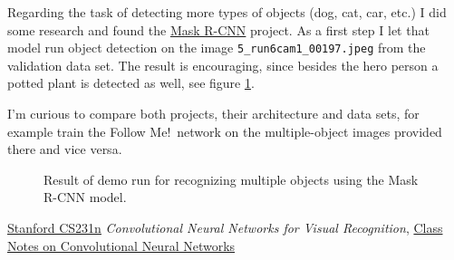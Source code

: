 \documentclass[11pt, onecolumn, oneside, reqno]{article}
\begin{document}
{{{{Regarding the task of detecting more types of objects (dog, cat, car, etc.) I did some research and found the \href{https://github.com/matterport/Mask_RCNN}{Mask R-CNN} project. As a first step I let that model run object detection on the image \texttt{5\_run6cam1\_00197.jpeg} from the validation data set. The result is encouraging, since besides the hero person a potted plant is detected as well, see figure \ref{img:example_mask_rcnn}.

I'm curious to compare both projects, their architecture and data sets, for example train the Follow Me!\ network on the multiple-object images provided there and vice versa.

\begin{figure}
\noindent
{}
\caption[Demo run for detecting object types]{Result of demo run for recognizing multiple objects using the Mask R-CNN model.}
\label{img:example_mask_rcnn}
\end{figure}

\begin{thebibliography}{3}
 \href{http://cs231n.stanford.edu/}{Stanford CS231n}
 \textit{Convolutional Neural Networks for Visual Recognition},
 \href{http://cs231n.github.io/convolutional-networks/}{Class Notes on Convolutional Neural Networks}


\end{thebibliography}}}}}
\end{document}
